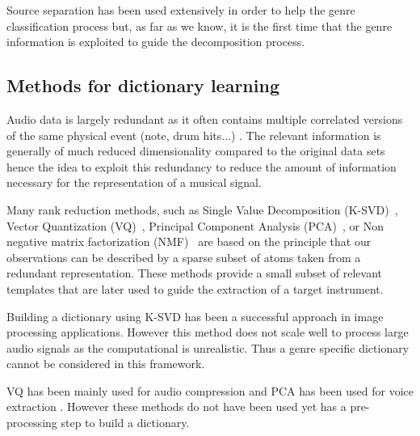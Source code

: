 \documentclass{article}
\begin{document}
Source separation has been used extensively in order to help the genre classification process \cite{rump2010autoregressive,lampropoulos2005musical} but, as far as we know, it is the first time that the genre information is exploited to guide the decomposition process. 


\subsection{Methods for dictionary learning}


Audio data is largely redundant as it often contains multiple correlated versions of the same physical event (note, drum hits...) \cite{tovsic2011dictionary}. The relevant information is generally of much reduced dimensionality compared to the original data sets hence the idea to exploit this redundancy to reduce the amount of information necessary for the representation of a musical signal. 

Many rank reduction methods, such as Single Value Decomposition (K-SVD)~\cite{aharon2006img}, Vector Quantization (VQ)~\cite{gersho2012vector}, Principal Component Analysis (PCA)~\cite{huang2012singing}, or Non negative matrix factorization (NMF)~\cite{Smaragdis03} are based on the principle that our observations can be described by a sparse subset of atoms taken from a redundant representation. These methods provide a small subset of relevant templates that are later used to guide the extraction of a target instrument. 


Building a dictionary using K-SVD has been a successful approach in image processing applications\cite{zhang2010discriminative}. However this method does not scale well to process large audio signals as the computational is unrealistic. Thus a genre specific dictionary cannot be considered in this framework.

VQ has been mainly used for audio compression \cite{gersho2012vector} and PCA has been used for voice extraction \cite{huang2012singing}. However these methods do not have been used yet has a pre-processing step to build a dictionary. 
\end{document}
